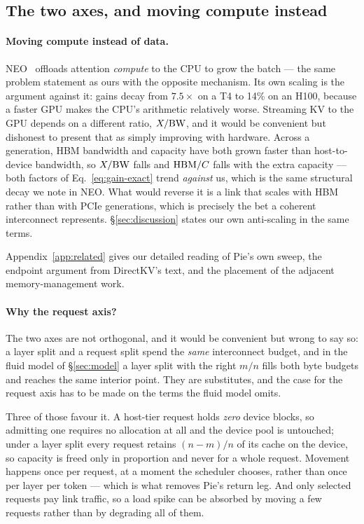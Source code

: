 \subsection*{The two axes, and moving compute instead}

\paragraph{Moving compute instead of data.} NEO~\cite{neo} offloads attention
\emph{compute} to the CPU to grow the batch --- the same problem statement as
ours with the opposite mechanism. Its own scaling is the argument against it:
gains decay from $7.5\times$ on a T4 to 14\% on an H100, because a faster GPU
makes the CPU's arithmetic relatively worse. Streaming KV to the GPU depends on
a different ratio, $X/\mathrm{BW}$, and it would be convenient but dishonest to
present that as simply improving with hardware. Across a generation, HBM
bandwidth and capacity have both grown faster than host-to-device bandwidth, so
$X/\mathrm{BW}$ falls and $\mathrm{HBM}/C$ falls with the extra capacity --- both
factors of Eq.~\ref{eq:gain-exact} trend \emph{against} us, which is the same
structural decay we note in NEO. What would reverse it is a link that scales
with HBM rather than with PCIe generations, which is precisely the bet a
coherent interconnect represents. \S\ref{sec:discussion} states our own
anti-scaling in the same terms.

Appendix~\ref{app:related} gives our detailed reading of Pie's own sweep, the
endpoint argument from DirectKV's text, and the placement of the adjacent
memory-management work.

\paragraph{Why the request axis?} The two axes are not orthogonal, and it would
be convenient but wrong to say so: a layer split and a request split spend the
\emph{same} interconnect budget, and in the fluid model of \S\ref{sec:model} a
layer split with the right $m/n$ fills both byte budgets and reaches the same
interior point. They are substitutes, and the case for the request axis has to
be made on the terms the fluid model omits.

Three of those favour it. A host-tier request holds \emph{zero} device blocks, so
admitting one requires no allocation at all and the device pool is untouched;
under a layer split every request retains $(n-m)/n$ of its cache on the device,
so capacity is freed only in proportion and never for a whole request. Movement
happens once per request, at a moment the scheduler chooses, rather than once per
layer per token --- which is what removes Pie's return leg. And only selected
requests pay link traffic, so a load spike can be absorbed by moving a few
requests rather than by degrading all of them.

